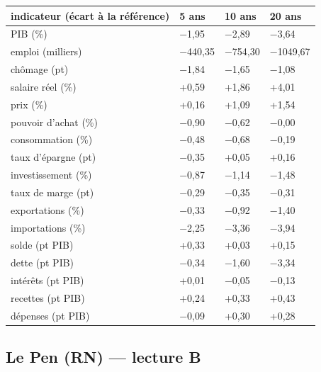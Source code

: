 \documentclass[
  11pt,
  11pt,
  a4paper,
  openany]{book}
\begin{document}
\begin{longtable}[]{@{}llll@{}}
\toprule\noalign{}
indicateur (écart à la référence) & 5 ans & 10 ans & 20 ans \\
\midrule\noalign{}
\endhead
\bottomrule\noalign{}
\endlastfoot
PIB (\%) & −1,95 & −2,89 & −3,64 \\
emploi (milliers) & −440,35 & −754,30 & −1049,67 \\
chômage (pt) & −1,84 & −1,65 & −1,08 \\
salaire réel (\%) & +0,59 & +1,86 & +4,01 \\
prix (\%) & +0,16 & +1,09 & +1,54 \\
pouvoir d'achat (\%) & −0,90 & −0,62 & −0,00 \\
consommation (\%) & −0,48 & −0,68 & −0,19 \\
taux d'épargne (pt) & −0,35 & +0,05 & +0,16 \\
investissement (\%) & −0,87 & −1,14 & −1,48 \\
taux de marge (pt) & −0,29 & −0,35 & −0,31 \\
exportations (\%) & −0,33 & −0,92 & −1,40 \\
importations (\%) & −2,25 & −3,36 & −3,94 \\
solde (pt PIB) & +0,33 & +0,03 & +0,15 \\
dette (pt PIB) & −0,34 & −1,60 & −3,34 \\
intérêts (pt PIB) & +0,01 & −0,05 & −0,13 \\
recettes (pt PIB) & +0,24 & +0,33 & +0,43 \\
dépenses (pt PIB) & −0,09 & +0,30 & +0,28 \\
\end{longtable}

\hypertarget{le-pen-rn-lecture-b}{%
\subsection{Le Pen (RN) --- lecture B}\label{le-pen-rn-lecture-b}}
\end{document}
